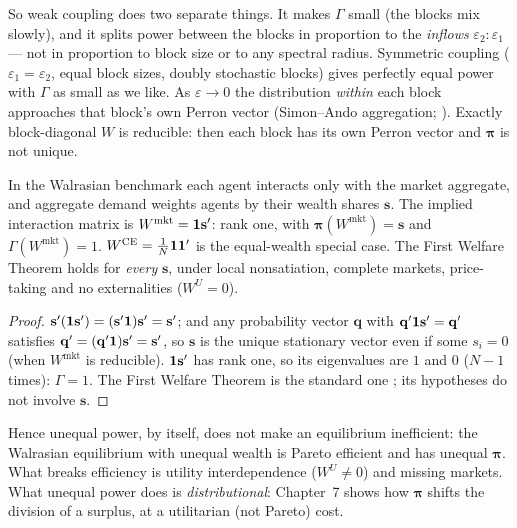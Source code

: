 \documentclass[../structural_economics_book.tex]{subfiles}
\begin{document}
So weak coupling does two separate things. It makes $\Gamma$ small (the blocks mix slowly), and it splits power between the blocks in proportion to the \textit{inflows} $\varepsilon_2 : \varepsilon_1$ --- not in proportion to block size or to any spectral radius. Symmetric coupling ($\varepsilon_1 = \varepsilon_2$, equal block sizes, doubly stochastic blocks) gives perfectly equal power with $\Gamma$ as small as we like. As $\varepsilon \to 0$ the distribution \textit{within} each block approaches that block's own Perron vector (Simon--Ando aggregation; \citealp{meyer2000matrix}). Exactly block-diagonal $W$ is reducible: then each block has its own Perron vector and $\boldsymbol{\pi}$ is not unique.

\begin{proposition}\label{ch06:prop:welfare_revisited}
In the Walrasian benchmark each agent interacts only with the market aggregate, and aggregate demand weights agents by their wealth shares $\mathbf{s}$. The implied interaction matrix is $W^{\text{mkt}} = \mathbf{1}\mathbf{s}'$: rank one, with $\boldsymbol{\pi}(W^{\text{mkt}}) = \mathbf{s}$ and $\Gamma(W^{\text{mkt}}) = 1$. $W^{\text{CE}} = \frac{1}{N}\mathbf{1}\mathbf{1}'$ is the equal-wealth special case. The First Welfare Theorem holds for \emph{every} $\mathbf{s}$, under local nonsatiation, complete markets, price-taking and no externalities ($W^U = 0$).
\end{proposition}

\begin{proof}
$\mathbf{s}'(\mathbf{1}\mathbf{s}') = (\mathbf{s}'\mathbf{1})\mathbf{s}' = \mathbf{s}'$; and any probability vector $\mathbf{q}$ with $\mathbf{q}'\mathbf{1}\mathbf{s}' = \mathbf{q}'$ satisfies $\mathbf{q}' = (\mathbf{q}'\mathbf{1})\mathbf{s}' = \mathbf{s}'$, so $\mathbf{s}$ is the unique stationary vector even if some $s_i = 0$ (when $W^{\text{mkt}}$ is reducible). $\mathbf{1}\mathbf{s}'$ has rank one, so its eigenvalues are $1$ and $0$ ($N-1$ times): $\Gamma = 1$. The First Welfare Theorem is the standard one \citep[e.g.][Prop.~16.C.1]{mascolell1995microeconomic}; its hypotheses do not involve $\mathbf{s}$.
\end{proof}

Hence unequal power, by itself, does not make an equilibrium inefficient: the Walrasian equilibrium with unequal wealth is Pareto efficient and has unequal $\boldsymbol{\pi}$. What breaks efficiency is utility interdependence ($W^U \neq 0$) and missing markets. What unequal power does is \textit{distributional}: Chapter~7 shows how $\boldsymbol{\pi}$ shifts the division of a surplus, at a utilitarian (not Pareto) cost.
\end{document}
